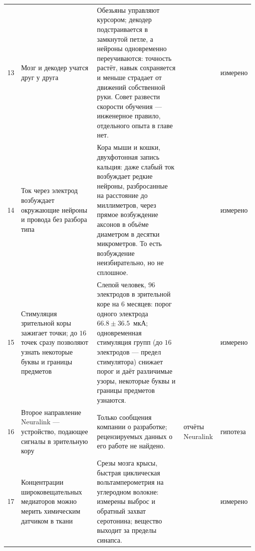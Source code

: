 {\begin{longtable}{>{\raggedright}p{0.5cm}>{\raggedright}p{4.0cm}>{\raggedright}p{5.6cm}>{\raggedright}p{2.3cm}>{\raggedright\arraybackslash}p{1.7cm}}
13 & Мозг и декодер учатся друг у друга & Обезьяны управляют курсором; декодер подстраивается в замкнутой петле, а нейроны одновременно переучиваются: точность растёт, навык сохраняется и меньше страдает от движений собственной руки. Совет развести скорости обучения --- инженерное правило, отдельного опыта в главе нет. & \cite{Orsborn2014coad} & измерено \\
14 & Ток через электрод возбуждает окружающие нейроны и провода без разбора типа & Кора мыши и кошки, двухфотонная запись кальция: даже слабый ток возбуждает редкие нейроны, разбросанные на расстояние до миллиметров, через прямое возбуждение аксонов в объёме диаметром в десятки микрометров. То есть возбуждение неизбирательно, но не сплошное. & \cite{Histed2009stim} & измерено \\
15 & Стимуляция зрительной коры зажигает точки; до $16$ точек сразу позволяют узнать некоторые буквы и границы предметов & Слепой человек, $96$ электродов в зрительной коре на $6$ месяцев: порог одного электрода $66.8\pm36.5$~мкА; одновременная стимуляция групп (до $16$ электродов --- предел стимулятора) снижает порог и даёт различимые узоры, некоторые буквы и границы предметов узнаются. & \cite{Fernandez2021} & измерено \\
16 & Второе направление Neuralink --- устройство, подающее сигналы в зрительную кору & Только сообщения компании о разработке; рецензируемых данных о его работе не найдено. & отчёты Neuralink & гипотеза \\
17 & Концентрации широковещательных медиаторов можно мерить химическим датчиком в ткани & Срезы мозга крысы, быстрая циклическая вольтамперометрия на углеродном волокне: измерены выброс и обратный захват серотонина; вещество выходит за пределы синапса. & \cite{Bunin1998} & измерено \\
\bottomrule
\end{longtable}}
